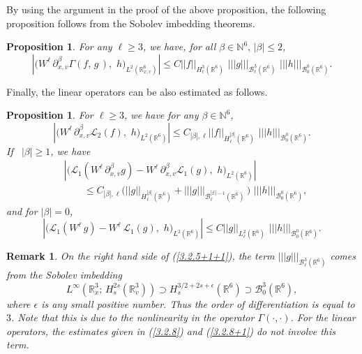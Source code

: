 \documentclass{amsart}[12pt, article]
\newtheorem{prop}[theo]{Proposition}
\newtheorem{rema}[theo]{Remark}
\begin{document}
By using the argument in the  proof of the above proposition,
 the following proposition follows {}from the Sobolev
 imbedding theorems.

\begin{prop}\label{cor3.2.3}
For any $\ell\geq 3$, we have, for all $\beta\in{{\mathbb N}}^6,\, |\beta|\leq
2$,
\begin{equation}\label{3.2.5+1+1}
\left|\Big(W^\ell \,\partial^\beta_{x, v} \Gamma(f,\, g\,),\,\,
h\Big)_{L^2({{{\mathbb R}}}^6_{x, v})}\right|\leq C ||f||_{H^3_\ell({{{\mathbb R}}}^6)}\,\,
||| g|||_{{{\mathcal B}}^{3}_\ell({{{\mathbb R}}}^6)}\,\, |||
h|||_{{{\mathcal B}}^0_0({{{\mathbb R}}}^6)}.
\end{equation}
\end{prop}

Finally, the linear operators can be also estimated as follows.

\begin{prop}\label{prop3.2.4}
For $\ell\geq 3$, we have for any $\beta\in{{\mathbb N}}^6$,
\begin{equation}\label{3.2.7}
\left|\Big(W^\ell \,\partial^\beta_{x, v} {{\mathcal L}}_2(f),\,\,
h\Big)_{L^2({{{\mathbb R}}}^6)}\right|\leq C_{|\beta|, \ell}
||f||_{H^{|\beta|}_\ell({{{\mathbb R}}}^6)}\,\, ||| h|||_{{{\mathcal B}}^0_0({{{\mathbb R}}}^6)}.
\end{equation}
If~ $|\beta|\ge 1$, we have
\begin{align}\label{3.2.8}
&\left|\Big({{\mathcal L}}_1(W^\ell \,\partial^\beta_{x, v} g)-W^\ell
\,\partial^\beta_{x, v} {{\mathcal L}}_1(g),\,\,
h\Big)_{L^2({{{\mathbb R}}}^6)}\right|\\
&\qquad\leq C_{|\beta|, \ell} \Big( ||
g||_{H^{|\beta|}_\ell({{{\mathbb R}}}^6)}+ |||
g|||_{{{\mathcal B}}^{|\beta\,|-1}_\ell({{{\mathbb R}}}^6)}\, \Big)\,\, |||
h|||_{{{\mathcal B}}^0_0({{{\mathbb R}}}^6)},\nonumber
\end{align}
and for $|\beta|=0$,
\begin{equation}\label{3.2.8+1}
\left|\Big({{\mathcal L}}_1(W^\ell \, g)-W^\ell \, {{\mathcal L}}_1(g),\,\,
h\Big)_{L^2({{{\mathbb R}}}^6)}\right|\leq C || g||_{L^{2}_\ell({{{\mathbb R}}}^6)}\,\, |||
h|||_{{{\mathcal B}}^0_0({{{\mathbb R}}}^6)}.
\end{equation}
\end{prop}
\begin{rema} On the right hand side of (\ref{3.2.5+1+1}), the term $||| g|||_{{{\mathcal B}}^{3}_\ell({{{\mathbb R}}}^6)}$
comes {}from the Sobolev imbedding
$$
L^\infty({{{\mathbb R}}}^3_x;\, H^{2s}_s({{{\mathbb R}}}^3_v))\supset
H^{3/2+2s+\epsilon}_s({{{\mathbb R}}}^6)\supset{{\mathcal B}}^3_0({{{\mathbb R}}}^6),
$$
where $\epsilon$ is any small positive number. Thus the order of differentiation is equal to $3$. Note that
this is due to the nonlinearity in the operator $\Gamma(\cdot,\cdot)$. For the linear operators, the estimates given in
(\ref{3.2.8}) and (\ref{3.2.8+1}) do not involve this term.
\end{rema}
\end{document}
